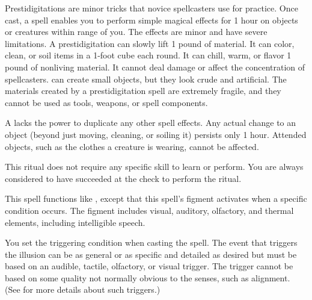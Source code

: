 \begin{spelleffect}
Prestidigitations are minor tricks that novice spellcasters use for practice. Once cast, a  spell enables you to perform simple magical effects for 1 hour on objects or creatures within \rngclose range of you. The effects are minor and have severe limitations. A prestidigitation can slowly lift 1 pound of material. It can color, clean, or soil items in a 1-foot cube each round. It can chill, warm, or flavor 1 pound of nonliving material. It cannot deal damage or affect the concentration of spellcasters.  can create small objects, but they look crude and artificial. The materials created by a prestidigitation spell are extremely fragile, and they cannot be used as tools, weapons, or spell components.
\end{spelleffect}
\begin{spellnotes}
A  lacks the power to duplicate any other spell effects. Any actual change to an object (beyond just moving, cleaning, or soiling it) persists only 1 hour. Attended objects, such as the clothes a creature is wearing, cannot be affected.

This ritual does not require any specific skill to learn or perform. You are always considered to have succeeded at the check to perform the ritual.
\end{spellnotes}

\begin{spelleffect}
This spell functions like , except that this spell's figment activates when a specific condition occurs. The figment includes visual, auditory, olfactory, and thermal elements, including intelligible speech.

You set the triggering condition when casting the spell. The event that triggers the illusion can be as general or as specific and detailed as desired but must be based on an audible, tactile, olfactory, or visual trigger. The trigger cannot be based on some quality not normally obvious to the senses, such as alignment. (See  for more details about such triggers.)
\end{spelleffect}

